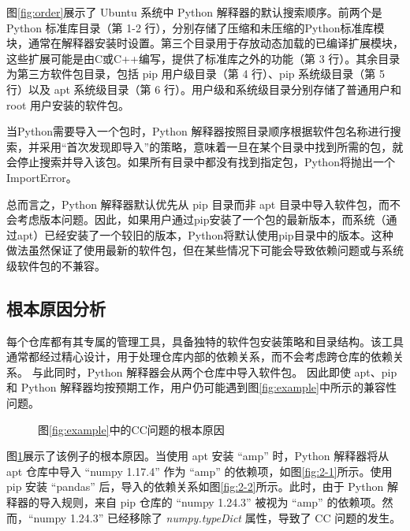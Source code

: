 图\ref{fig:order}展示了 Ubuntu 系统中 Python 解释器的默认搜索顺序。前两个是 Python 标准库目录（第 1-2 行），分别存储了压缩和未压缩的Python标准库模块，通常在解释器安装时设置。第三个目录用于存放动态加载的已编译扩展模块，这些扩展可能是由C或C++编写，提供了标准库之外的功能（第 3 行）。其余目录为第三方软件包目录，包括 pip 用户级目录（第 4 行）、pip 系统级目录（第 5 行）以及 apt 系统级目录（第 6 行）。用户级和系统级目录分别存储了普通用户和 root 用户安装的软件包。

当Python需要导入一个包时，Python 解释器按照目录顺序根据软件包名称进行搜索，并采用“首次发现即导入”的策略，意味着一旦在某个目录中找到所需的包，就会停止搜索并导入该包。如果所有目录中都没有找到指定包，Python将抛出一个ImportError。

总而言之，Python 解释器默认优先从 pip 目录而非 apt 目录中导入软件包，而不会考虑版本问题。因此，如果用户通过pip安装了一个包的最新版本，而系统（通过apt）已经安装了一个较旧的版本，Python将默认使用pip目录中的版本。这种做法虽然保证了使用最新的软件包，但在某些情况下可能会导致依赖问题或与系统级软件包的不兼容。

\subsection{根本原因分析}
每个仓库都有其专属的管理工具，具备独特的软件包安装策略和目录结构。该工具通常都经过精心设计，用于处理仓库内部的依赖关系，而不会考虑跨仓库的依赖关系。
与此同时，Python 解释器会从两个仓库中导入软件包。
因此即使 apt、pip 和 Python 解释器均按预期工作，用户仍可能遇到图\ref{fig:example}中所示的兼容性问题。
\begin{figure}[t]
	\centering
	\hspace{4em}
	\caption{图\ref{fig:example}中的CC问题的根本原因}
	\label{fig:2}
\end{figure}
图\ref{fig:2}展示了该例子的根本原因。当使用 apt 安装 “amp” 时，Python 解释器将从 apt 仓库中导入 “numpy 1.17.4” 作为 “amp” 的依赖项，如图\ref{fig:2-1}所示。使用 pip 安装 “pandas” 后，导入的依赖关系如图\ref{fig:2-2}所示。此时，由于 Python 解释器的导入规则，来自 pip 仓库的 “numpy 1.24.3” 被视为 “amp” 的依赖项。然而，“numpy 1.24.3” 已经移除了 \textit{numpy.typeDict} 属性，导致了 CC 问题的发生。


